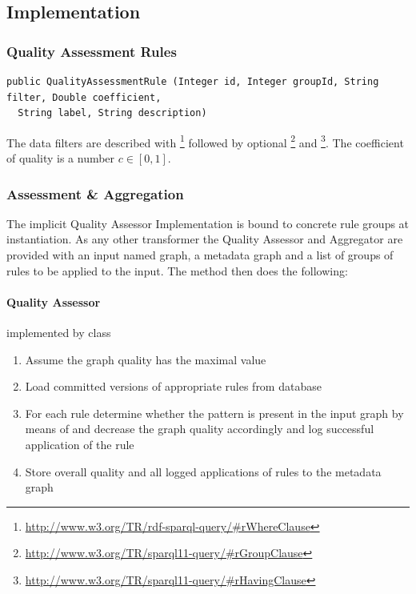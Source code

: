 \subsection{Implementation}

\subsubsection*{Quality Assessment Rules}

\begin{lstlisting}[caption=Quality Assessment rule constructor,label=lst:qualityAssessmentRule]
public QualityAssessmentRule (Integer id, Integer groupId, String filter, Double coefficient,
  String label, String description) 
\end{lstlisting}

The data filters are described with \footnote{\url{http://www.w3.org/TR/rdf-sparql-query/\#rWhereClause}} followed by optional \footnote{\url{http://www.w3.org/TR/sparql11-query/\#rGroupClause}} and \footnote{\url{http://www.w3.org/TR/sparql11-query/\#rHavingClause}}.
The coefficient of quality is a number $c \in [0,1]$.

\subsubsection*{Assessment \& Aggregation}

The implicit Quality Assessor Implementation is bound to concrete rule groups at instantiation. As any other transformer the Quality Assessor and Aggregator are provided with an input named graph, a metadata graph and a list of groups of rules to be applied to the input. The  method then does the following:

\paragraph{Quality Assessor} implemented by class 

\begin{enumerate}
	\item Assume the graph quality has the maximal value
	\item Load committed versions of appropriate rules from database
	\item \label{itm:QAApplyStep} For each rule determine whether the pattern is present in the input graph by means of  and decrease the graph quality accordingly and log successful application of the rule
	\item Store overall quality and all logged applications of rules to the metadata graph
\end{enumerate}

